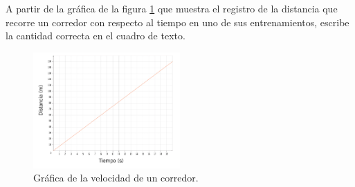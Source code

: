 A partir de la gráfica de la figura \ref{fig:SINMAT1_U3_AC75_IMG2} que muestra el registro de la distancia que recorre un corredor con respecto al tiempo en uno de sus entrenamientos, escribe la cantidad correcta en el cuadro de texto.

\begin{multicols}{2}
    \begin{figure}[H]
        \centering
        \includegraphics[width=0.5\textwidth]{../images/SINMAT1_U3_AC75_IMG2.jpg}
        \caption{Gráfica de la velocidad de un corredor.}
        \label{fig:SINMAT1_U3_AC75_IMG2}
    \end{figure}
    \begin{parts}
        
        
        
        
        
    \end{parts}
\end{multicols}